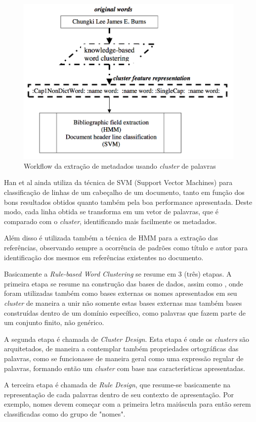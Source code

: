 \documentclass[
	12pt,               %
	openright,          %
	twoside,            %
	a4paper,            %
	english,            %
	brazil              %
	]{abntex2}
\begin{document}
\begin{figure}
\centering
\caption{Workflow da extração de metadados usando \textit{cluster} de palavras}
\label{fig:workflow-rule-based}
\includegraphics[width=0.7\linewidth]{./assets/workflow-rule-based}
\end{figure}

Han et al ainda utiliza da técnica  de SVM (Support Vector Machines) para classificação de linhas de um cabeçalho de um documento, tanto em função dos bons resultados obtidos quanto também pela boa performance apresentada. Deste modo, cada linha obtida se transforma em um vetor de palavras, que é comparado com o \textit{cluster}, identificando mais facilmente os metadados.

Além disso é utilizada também a técnica de HMM \cite{hmm2} para a extração das referências, observando sempre a ocorrência de padrões como título e autor para identificação dos mesmos em referências existentes no documento.

Basicamente a \textit{Rule-based Word Clustering} se resume em 3 (três) etapas. A primeira etapa se resume na construção das bases de dados, assim como \cite{svm}, onde foram utilizadas também como bases externas os nomes apresentados em seu \textit{cluster} de maneira a unir não somente estas bases externas mas também bases construídas dentro de um domínio específico, como palavras que fazem parte de um conjunto finito, não genérico.

A segunda etapa é chamada de \textit{Cluster Design}. Esta etapa é onde os \textit{clusters} são arquitetados, de maneira a contemplar também propriedades ortográficas das palavras, como se funcionasse de maneira geral como uma expressão regular de palavras, formando então um \textit{cluster} com base nas características apresentadas.

A terceira etapa é chamada de \textit{Rule Design}, que resume-se basicamente na representação de cada palavras dentro de seu contexto de apresentação. Por exemplo, nomes devem começar com a primeira letra maiúscula para então serem classificadas como do grupo de "nomes".
\end{document}

